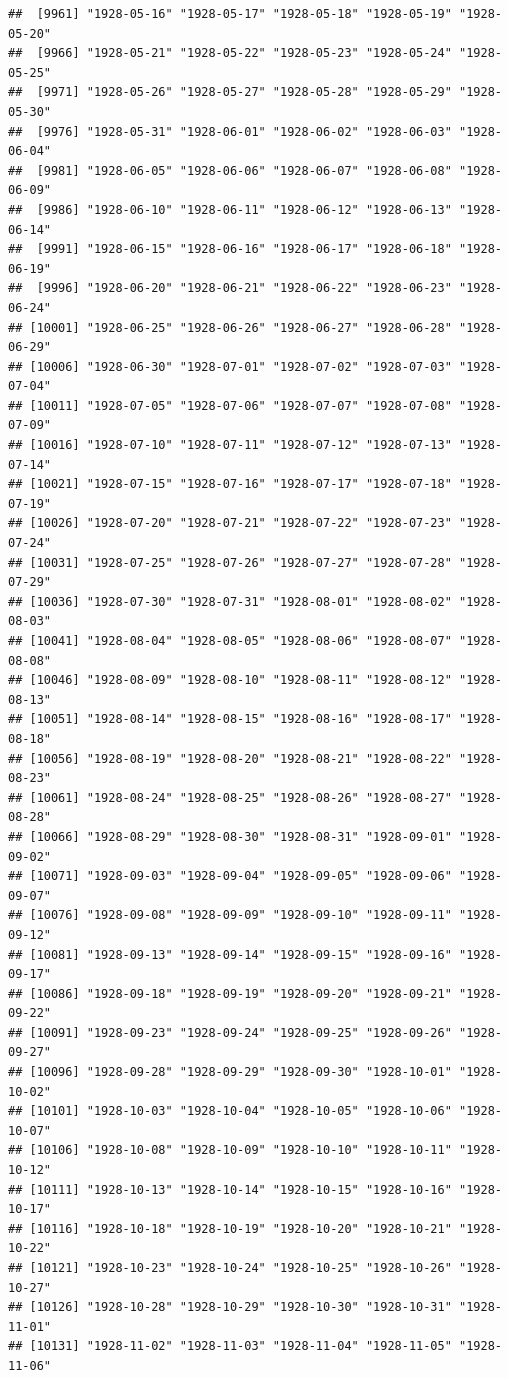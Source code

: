 \documentclass{article}\usepackage[]{graphicx}\usepackage[]{color}
\makeatletter
\newenvironment{kframe}{%
 \def\at@end@of@kframe{}%
 \ifinner\ifhmode%
  \def\at@end@of@kframe{\end{minipage}}%
  \begin{minipage}{\columnwidth}%
 \fi\fi%
 \def\FrameCommand##1{\hskip\@totalleftmargin \hskip-\fboxsep
 \colorbox{shadecolor}{##1}\hskip-\fboxsep
     \hskip-\linewidth \hskip-\@totalleftmargin \hskip\columnwidth}%
 \MakeFramed {\advance\hsize-\width
   \@totalleftmargin\z@ \linewidth\hsize
   \@setminipage}}%
 {\par\unskip\endMakeFramed%
 \at@end@of@kframe}
\newenvironment{knitrout}{}{} %
\makeatother
\begin{document}
\begin{description}
\begin{knitrout}
\begin{kframe}
\begin{verbatim}
##  [9961] "1928-05-16" "1928-05-17" "1928-05-18" "1928-05-19" "1928-05-20"
##  [9966] "1928-05-21" "1928-05-22" "1928-05-23" "1928-05-24" "1928-05-25"
##  [9971] "1928-05-26" "1928-05-27" "1928-05-28" "1928-05-29" "1928-05-30"
##  [9976] "1928-05-31" "1928-06-01" "1928-06-02" "1928-06-03" "1928-06-04"
##  [9981] "1928-06-05" "1928-06-06" "1928-06-07" "1928-06-08" "1928-06-09"
##  [9986] "1928-06-10" "1928-06-11" "1928-06-12" "1928-06-13" "1928-06-14"
##  [9991] "1928-06-15" "1928-06-16" "1928-06-17" "1928-06-18" "1928-06-19"
##  [9996] "1928-06-20" "1928-06-21" "1928-06-22" "1928-06-23" "1928-06-24"
## [10001] "1928-06-25" "1928-06-26" "1928-06-27" "1928-06-28" "1928-06-29"
## [10006] "1928-06-30" "1928-07-01" "1928-07-02" "1928-07-03" "1928-07-04"
## [10011] "1928-07-05" "1928-07-06" "1928-07-07" "1928-07-08" "1928-07-09"
## [10016] "1928-07-10" "1928-07-11" "1928-07-12" "1928-07-13" "1928-07-14"
## [10021] "1928-07-15" "1928-07-16" "1928-07-17" "1928-07-18" "1928-07-19"
## [10026] "1928-07-20" "1928-07-21" "1928-07-22" "1928-07-23" "1928-07-24"
## [10031] "1928-07-25" "1928-07-26" "1928-07-27" "1928-07-28" "1928-07-29"
## [10036] "1928-07-30" "1928-07-31" "1928-08-01" "1928-08-02" "1928-08-03"
## [10041] "1928-08-04" "1928-08-05" "1928-08-06" "1928-08-07" "1928-08-08"
## [10046] "1928-08-09" "1928-08-10" "1928-08-11" "1928-08-12" "1928-08-13"
## [10051] "1928-08-14" "1928-08-15" "1928-08-16" "1928-08-17" "1928-08-18"
## [10056] "1928-08-19" "1928-08-20" "1928-08-21" "1928-08-22" "1928-08-23"
## [10061] "1928-08-24" "1928-08-25" "1928-08-26" "1928-08-27" "1928-08-28"
## [10066] "1928-08-29" "1928-08-30" "1928-08-31" "1928-09-01" "1928-09-02"
## [10071] "1928-09-03" "1928-09-04" "1928-09-05" "1928-09-06" "1928-09-07"
## [10076] "1928-09-08" "1928-09-09" "1928-09-10" "1928-09-11" "1928-09-12"
## [10081] "1928-09-13" "1928-09-14" "1928-09-15" "1928-09-16" "1928-09-17"
## [10086] "1928-09-18" "1928-09-19" "1928-09-20" "1928-09-21" "1928-09-22"
## [10091] "1928-09-23" "1928-09-24" "1928-09-25" "1928-09-26" "1928-09-27"
## [10096] "1928-09-28" "1928-09-29" "1928-09-30" "1928-10-01" "1928-10-02"
## [10101] "1928-10-03" "1928-10-04" "1928-10-05" "1928-10-06" "1928-10-07"
## [10106] "1928-10-08" "1928-10-09" "1928-10-10" "1928-10-11" "1928-10-12"
## [10111] "1928-10-13" "1928-10-14" "1928-10-15" "1928-10-16" "1928-10-17"
## [10116] "1928-10-18" "1928-10-19" "1928-10-20" "1928-10-21" "1928-10-22"
## [10121] "1928-10-23" "1928-10-24" "1928-10-25" "1928-10-26" "1928-10-27"
## [10126] "1928-10-28" "1928-10-29" "1928-10-30" "1928-10-31" "1928-11-01"
## [10131] "1928-11-02" "1928-11-03" "1928-11-04" "1928-11-05" "1928-11-06"

\end{verbatim}
\end{kframe}
\end{knitrout}
\end{description}
\end{document}
